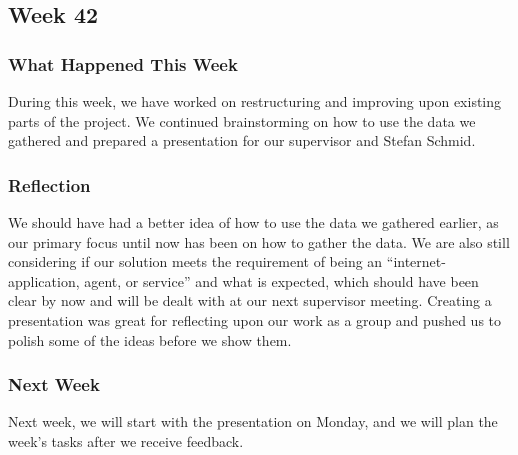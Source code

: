 \subsection{Week 42}
\subsubsection{What Happened This Week} 
During this week, we have worked on restructuring and improving upon existing
parts of the project. We continued brainstorming on how to use the data we
gathered and prepared a presentation for our supervisor and Stefan Schmid.

\subsubsection{Reflection}
We should have had a better idea of how to use the data we gathered earlier, as
our primary focus until now has been on how to gather the data.
We are also still considering if our solution meets the requirement of being an
``internet- application, agent, or service'' and what is expected, which should
have been clear by now and will be dealt with at our next supervisor meeting.
Creating a presentation was great for reflecting upon our work as a group and
pushed us to polish some of the ideas before we show them.

\subsubsection{Next Week}
Next week, we will start with the presentation on Monday, and we will plan the
week's tasks after we receive feedback.


